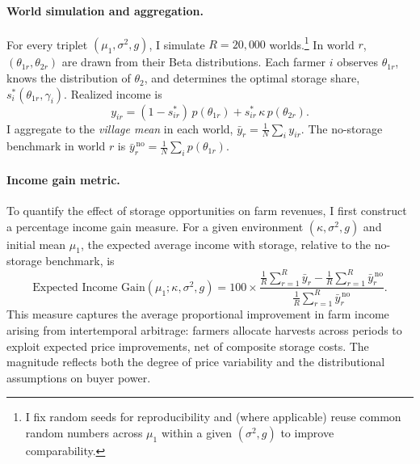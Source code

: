 \paragraph{World simulation and aggregation.}
For every triplet $(\mu_1,\sigma^2,g)$, I simulate $R=20{,}000$ worlds.\footnote{I fix random seeds for reproducibility and (where applicable) reuse common random numbers across $\mu_1$ within a given $(\sigma^2,g)$ to improve comparability.} In world $r$, $(\theta_{1r},\theta_{2r})$ are drawn from their Beta distributions. Each farmer $i$ observes $\theta_{1r}$, knows the distribution of $\theta_2$, and determines the optimal storage share, $s^*_i(\theta_{1r},\gamma_i)$. Realized income is
$$
y_{ir}=(1-s^*_{ir})\,p(\theta_{1r})+s^*_{ir}\,\kappa\,p(\theta_{2r}).
$$
I aggregate to the \emph{village mean} in each world, $\bar y_r=\frac{1}{N}\sum_i y_{ir}$. The no-storage benchmark in world $r$ is $\bar y^{\,\text{no}}_r=\frac{1}{N}\sum_i p(\theta_{1r})$.



\paragraph{Income gain metric.}  
To quantify the effect of storage opportunities on farm revenues, I first construct a percentage income gain measure. For a given environment $(\kappa,\sigma^2,g)$ and initial mean $\mu_1$, the expected average income with storage, relative to the no-storage benchmark, is  
\begin{equation}
\text{Expected Income Gain}(\mu_1;\kappa,\sigma^2,g)
=100\times
\frac{\frac{1}{R}\sum_{r=1}^R \bar y_{r}-\frac{1}{R}\sum_{r=1}^R \bar y^{\,\text{no}}_{r}}
{\frac{1}{R}\sum_{r=1}^R \bar y^{\,\text{no}}_{r}}.
\end{equation}
This measure captures the average proportional improvement in farm income arising from intertemporal arbitrage: farmers allocate harvests across periods to exploit expected price improvements, net of composite storage costs. The magnitude reflects both the degree of price variability and the distributional assumptions on buyer power.



